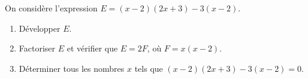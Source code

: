
\medskip

On considère l'expression $E = (x - 2)(2x + 3) - 3(x - 2)$.

\medskip

\begin{enumerate}
\item Développer $E$.
\item Factoriser $E$ et vérifier que $E = 2F$, où $F = x(x - 2)$.
\item Déterminer tous les nombres $x$ tels que $(x - 2)(2x + 3) - 3(x - 2) = 0$.
\end{enumerate}
 
\bigskip
 
